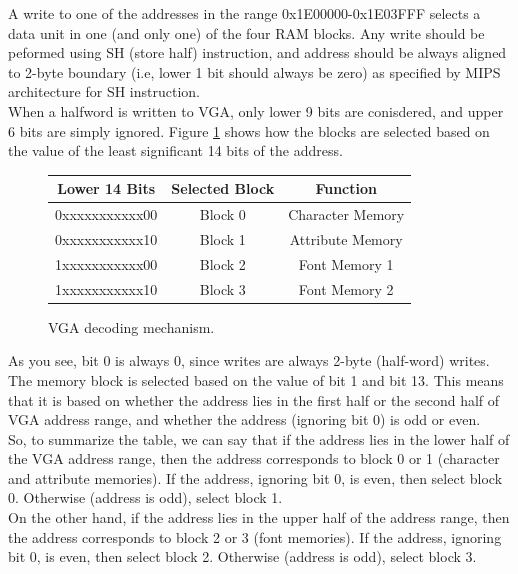 \documentclass[oneside]{book}
\begin{document}
A write to one of the addresses in the range 0x1E00000-0x1E03FFF selects
a data unit in one (and only one) of the four RAM blocks.
Any write should be peformed using SH (store half) instruction, and
address should be always aligned to 2-byte boundary (i.e, lower 1 bit
should always be zero) as specified by MIPS architecture for SH instruction.\\

When a halfword is written to VGA, only lower 9 bits are conisdered, and
upper 6 bits are simply ignored. Figure 
\ref{vgamap} shows how the blocks are selected based on the value
of the least significant 14 bits of the address.

\begin{figure}[H]
\begin{center}
\begin{tabular}{|c|c|c|}

\hline \textbf{Lower 14 Bits} & \textbf{Selected Block} & \textbf{Function} \\

\hline 0xxxxxxxxxxx00 & Block 0 & Character Memory \\
\hline 0xxxxxxxxxxx10 & Block 1 & Attribute Memory \\
\hline 1xxxxxxxxxxx00 & Block 2 & Font Memory 1 \\
\hline 1xxxxxxxxxxx10 & Block 3 & Font Memory 2 \\

\hline

\end{tabular}
\end{center}
\caption{VGA decoding mechanism.}
\label{vgamap}
\end{figure}

As you see, bit 0 is always 0, since writes are always 2-byte (half-word) 
writes. The memory block is selected based on the value of bit 1 and bit 13.
This means that it is based on whether the address lies in the first half
or the second half of VGA address range, and whether the address (ignoring
bit 0) is odd or even. \\

So, to summarize the table, we can say that if the address lies in the
lower half of the VGA address range, then the address corresponds to
block 0 or 1 (character and attribute memories). If the address, ignoring
bit 0, is even, then select block 0. Otherwise (address is odd), select
block 1. \\

On the other hand, if the address lies in the upper half of the address range,
then the address corresponds to block 2 or 3 (font memories). If the address,
ignoring bit 0, is even, then select block 2. Otherwise (address is odd),
select block 3. \\
\end{document}
